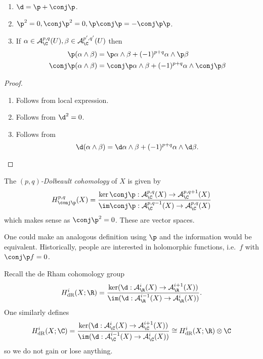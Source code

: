 \documentclass[a4paper]{article}
\newcommand{\w}{\wedge} %
\begin{document}
\begin{lemma}\leavevmode
  \begin{enumerate}
  \item \(\d = \p + \conj \p\).
  \item \(\p^2 = 0, \conj \p^2 = 0, \p \conj \p = - \conj \p \p\).
  \item If \(\alpha \in \mathcal A_\C^{p, q}(U), \beta \in \mathcal A_\C^{p', q'}(U)\) then
    \begin{align*}
      \p(\alpha \w \beta) &= \p \alpha \w \beta + (-1)^{p + q} \alpha \w \p \beta \\
      \conj \p(\alpha \w \beta) &= \conj \p \alpha \w \beta + (-1)^{p + q} \alpha \w \conj \p \beta \\
    \end{align*}
  \end{enumerate}
\end{lemma}

\begin{proof}\leavevmode
  \begin{enumerate}
  \item Follows from local expression.
  \item Follows from \(\d^2 = 0\).
  \item Follows from
    \[
      \d(\alpha \w \beta) = \d\alpha \w \beta + (-1)^{p + q} \alpha \w \d \beta.
    \]
  \end{enumerate}
\end{proof}

\begin{definition}
  The \emph{\((p, q)\)-Dolbeault cohomology} of \(X\) is given by
  \[
    H_{\conj \p}^{p, q}(X) = \frac{\ker \conj \p: \mathcal A_\C^{p, q}(X) \to \mathcal A_\C^{p, q + 1}(X)}{\im \conj \p: \mathcal A_\C^{p, q - 1}(X) \to \mathcal A_\C^{p, q}(X)}
  \]
  which makes sense as \(\conj \p^2 = 0\). These are vector spaces.
\end{definition}

\begin{remark}
  One could make an analogous definition using \(\p\) and the information would be equivalent. Historically, people are interested in holomorphic functions, i.e.\ \(f\) with \(\conj \p f = 0\).
\end{remark}

Recall the de Rham cohomology group
\[
  H_{\text{dR}}^i(X; \R) = \frac{\ker (\d: \mathcal A_\R^i(X) \to \mathcal A_\R^{i + 1}(X))}{\im (\d: \mathcal A_\R^{i - 1}(X) \to \mathcal A_\R^i(X))}.
\]
One similarly defines
\[
  H_{\text{dR}}^i(X; \C) = \frac{\ker (\d: \mathcal A_\C^i(X) \to \mathcal A_\C^{i + 1}(X))}{\im (\d: \mathcal A_\C^{i - 1}(X) \to \mathcal A_\C^i(X))}
  \cong H_{\text{dR}}^i(X; \R) \otimes \C
\]
so we do not gain or lose anything.
\end{document}
